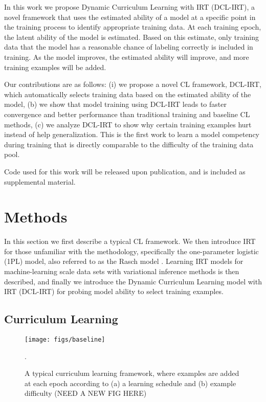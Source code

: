 \documentclass[letterpaper]{article} %
\begin{document}
In this work we propose Dynamic Curriculum Learning with IRT (DCL-IRT), a novel framework that uses the estimated ability of a model at a specific point in the training process to identify appropriate training data.
At each training epoch, the latent ability of the model is estimated.
Based on this estimate, only training data that the model has a reasonable chance of labeling correctly is included in training.
As the model improves, the estimated ability will improve, and more training examples will be added.

Our contributions are as follows: (i) we propose a novel CL framework, DCL-IRT, which automatically selects training data based on the estimated ability of the model, (b) we show that model training using DCL-IRT leads to faster convergence and better performance than traditional training and baseline CL methods, (c) we analyze DCL-IRT to show why certain training examples hurt instead of help generalization.
This is the first work to learn a model competency during training that is directly comparable to the difficulty of the training data pool.

Code used for this work will be released upon publication, and is included as supplemental material.

\section{Methods}

In this section we first describe a typical CL framework.
We then introduce IRT for those unfamiliar with the methodology, specifically the one-parameter logistic (1PL) model, also referred to as the Rasch model \cite{rasch_studies_1960,baker_item_2004}.
Learning IRT models for machine-learning scale data sets with variational inference methods is then described, and finally we introduce the Dynamic Curriculum Learning model with IRT (DCL-IRT) for probing model ability to select training examples.

\subsection{Curriculum Learning}
\begin{figure}[ht]
	\centering 
	\texttt{[image: figs/baseline]}
	\caption{A typical curriculum learning framework, where examples are added at each epoch according to (a) a learning schedule and (b) example difficulty (NEED A NEW FIG HERE)}.
	\label{fig:cl_framework} 
\end{figure}
\end{document}
